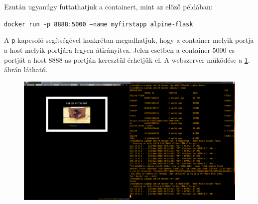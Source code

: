 \documentclass[]{article}
\numberwithin{equation}{section}
\begin{document}
\vskip10pt
Ezután ugyanúgy futtathatjuk a containert, mint az előző példában:

\texttt{docker run -p 8888:5000 --name myfirstapp alpine-flask}

A \texttt{p} kapcsoló segítségével konkrétan megadhatjuk, hogy a container melyik portja a host melyik portjára legyen átirányítva. Jelen esetben a container 5000-es portját a host 8888-as portján keresztül érhetjük el.  A webszerver működése a \ref{fig:cats}. ábrán látható.

\begin{figure}[H]
	\centering
	\includegraphics[width=0.9\linewidth]{cats}
	\caption{}
	\label{fig:cats}
\end{figure}
\end{document}
